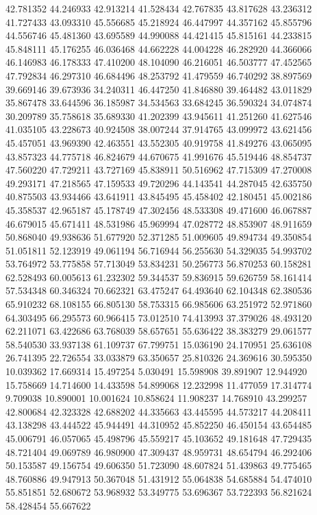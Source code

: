 42.781352
44.246933
42.913214
41.528434
42.767835
43.817628
43.236312
41.727433
43.093310
45.556685
45.218924
46.447997
44.357162
45.855796
44.556746
45.481360
43.695589
44.990088
44.421415
45.815161
44.233815
45.848111
45.176255
46.036468
44.662228
44.004228
46.282920
44.366066
46.146983
46.178333
47.410200
48.104090
46.216051
46.503777
47.452565
47.792834
46.297310
46.684496
48.253792
41.479559
46.740292
38.897569
39.669146
39.673936
34.240311
46.447250
41.846880
39.464482
43.011829
35.867478
33.644596
36.185987
34.534563
33.684245
36.590324
34.074874
30.209789
35.758618
35.689330
41.202399
43.945611
41.251260
41.627546
41.035105
43.228673
40.924508
38.007244
37.914765
43.099972
43.621456
45.457051
43.969390
42.463551
43.552305
40.919758
41.849276
43.065095
43.857323
44.775718
46.824679
44.670675
41.991676
45.519446
48.854737
47.560220
47.729211
43.727169
45.838911
50.516962
47.715309
47.270008
49.293171
47.218565
47.159533
49.720296
44.143541
44.287045
42.635750
40.875503
43.934466
43.641911
43.845495
45.458402
42.180451
45.002186
45.358537
42.965187
45.178749
47.302456
48.533308
49.471600
46.067887
46.679015
45.671411
48.531986
45.969994
47.028772
48.853907
48.911659
50.868040
49.938636
51.677920
52.371285
51.009605
49.894734
49.350854
51.051811
52.123919
49.061194
56.716944
56.255630
54.329035
54.993702
53.764972
53.775858
57.713049
53.834231
50.256773
56.870253
60.158281
62.528493
60.005613
61.232302
59.344537
59.836915
59.626759
58.161414
57.534348
60.346324
70.662321
63.475247
64.493640
62.104348
62.380536
65.910232
68.108155
66.805130
58.753315
66.985606
63.251972
52.971860
64.303495
66.295573
60.966415
73.012510
74.413993
37.379026
48.493120
62.211071
63.422686
63.768039
58.657651
55.636422
38.383279
29.061577
58.540530
33.937138
61.109737
67.799751
15.036190
24.170951
25.636108
26.741395
22.726554
33.033879
63.350657
25.810326
24.369616
30.595350
10.039362
17.669314
15.497254
5.030491
15.598908
39.891907
12.944920
15.758669
14.714600
14.433598
54.899068
12.232998
11.477059
17.314774
9.709038
10.890001
10.001624
10.858624
11.908237
14.768910
43.299257
42.800684
42.323328
42.688202
44.335663
43.445595
44.573217
44.208411
43.138298
43.444522
45.944491
44.310952
45.852250
46.450154
43.654485
45.006791
46.057065
45.498796
45.559217
45.103652
49.181648
47.729435
48.721404
49.069789
46.980900
47.309437
48.959731
48.654794
46.292406
50.153587
49.156754
49.606350
51.723090
48.607824
51.439863
49.775465
48.760886
49.947913
50.367048
51.431912
55.064838
54.685884
54.474010
55.851851
52.680672
53.968932
53.349775
53.696367
53.722393
56.821624
58.428454
55.667622
